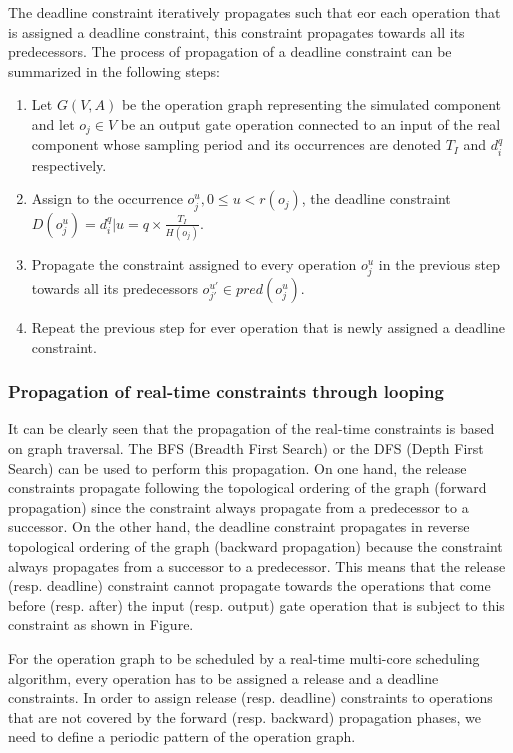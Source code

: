 The deadline constraint iteratively propagates such that eor each operation that is assigned a deadline constraint, this constraint propagates towards all its predecessors. The process of propagation of a deadline constraint can be summarized in the following steps:

\begin{enumerate}
\item Let $G(V,A)$ be the operation graph representing the simulated component and let $o_j \in  V$ be an output gate operation connected to an input of the real component whose sampling period and its occurrences are denoted $T_I$ and $d_i^q$ respectively.
\item Assign to the occurrence $o_j^u, 0 \leq u < r(o_j)$, the deadline constraint $D(o_j^u) = d_i^q | u = q \times \frac{T_I}{H(o_j)}$.
\item Propagate the constraint assigned to every operation $o_j^u$ in the previous step towards all its predecessors $o_{j'}^{u'} \in pred(o_j^u)$.
\item Repeat the previous step for ever operation that is newly assigned a deadline constraint.
\end{enumerate}

\subsubsection{Propagation of real-time constraints through looping}

It can be clearly seen that the propagation of the real-time constraints is based on graph traversal. The BFS (Breadth First Search) or the DFS (Depth First Search) can be used to perform this propagation. On one hand, the release constraints propagate following the topological ordering of the graph (forward propagation) since the constraint always propagate from a predecessor to a successor. On the other hand, the deadline constraint propagates in reverse topological ordering of the graph (backward propagation) because the constraint always propagates from a successor to a predecessor. This means that the release (resp. deadline) constraint cannot propagate towards the operations that come before (resp. after) the input (resp. output) gate operation that is subject to this constraint as shown in Figure.

For the operation graph to be scheduled by a real-time multi-core scheduling algorithm, every operation has to be assigned a release and a deadline constraints. In order to assign release (resp. deadline) constraints to operations that are not covered by the forward (resp. backward) propagation phases, we need to define a periodic pattern of the operation graph.

